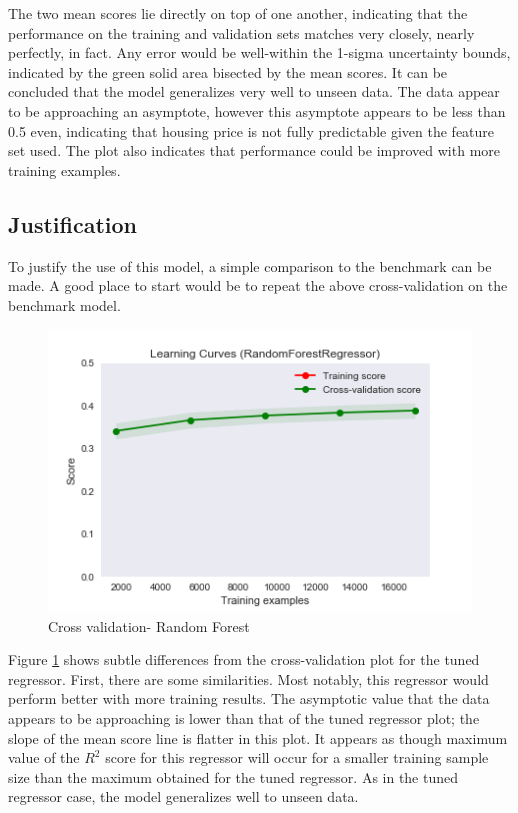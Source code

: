 \documentclass[12pt]{article}
\theoremstyle{plain} %
\theoremstyle{definition} %
\theoremstyle{remark} %
\begin{document}
The two mean scores lie directly on top of one another, indicating that the performance on the training and validation sets matches very closely, nearly perfectly, in fact.  Any error would be well-within the 1-sigma uncertainty bounds, indicated by the green solid area bisected by the mean scores.  It can be concluded that the model generalizes very well to unseen data.  The data appear to be approaching an asymptote, however this asymptote appears to be less than 0.5 even, indicating that housing price is not fully predictable given the feature set used.  The plot also indicates that performance could be improved with more training examples.

\subsection*{Justification}

To justify the use of this model, a simple comparison to the benchmark can be made.  A good place to start would be to repeat the above cross-validation on the benchmark model.

\begin{figure}[h!]
\begin{center}
\includegraphics[width=12cm]{./output_images/rgr_cv.png}
\caption{Cross validation- Random Forest}
\label{fig:fifteen}
\end{center}
\end{figure}

Figure \ref{fig:fifteen} shows subtle differences from the cross-validation plot for the tuned regressor.  First, there are some similarities.  Most notably, this regressor would perform better with more training results.  The asymptotic value that the data appears to be approaching is lower than that of the tuned regressor plot; the slope of the mean score line is flatter in this plot.  It appears as though maximum value of the $R^2$ score for this regressor will occur for a smaller training sample size than the maximum obtained for the tuned regressor.  As in the tuned regressor case, the model generalizes well to unseen data.
\end{document}
